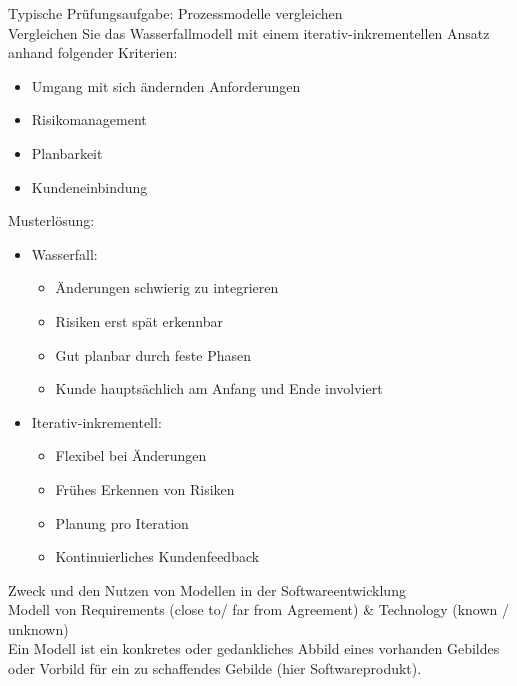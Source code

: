 \begin{example2}{Typische Prüfungsaufgabe: Prozessmodelle vergleichen}\\
Vergleichen Sie das Wasserfallmodell mit einem iterativ-inkrementellen Ansatz anhand folgender Kriterien:
\begin{itemize}
    \item Umgang mit sich ändernden Anforderungen
    \item Risikomanagement
    \item Planbarkeit
    \item Kundeneinbindung
\end{itemize}

Musterlösung:
\begin{itemize}
    \item Wasserfall:
    \begin{itemize}
        \item Änderungen schwierig zu integrieren
        \item Risiken erst spät erkennbar
        \item Gut planbar durch feste Phasen
        \item Kunde hauptsächlich am Anfang und Ende involviert
    \end{itemize}
    \item Iterativ-inkrementell:
    \begin{itemize}
        \item Flexibel bei Änderungen
        \item Frühes Erkennen von Risiken
        \item Planung pro Iteration
        \item Kontinuierliches Kundenfeedback
    \end{itemize}
\end{itemize}
\end{example2}

\begin{concept}{Zweck und den Nutzen von Modellen in der Softwareentwicklung}\\
Modell von Requirements (close to/ far from Agreement) \& Technology (known / unknown)\\
Ein Modell ist ein konkretes oder gedankliches Abbild eines vorhanden Gebildes oder Vorbild für ein zu schaffendes Gebilde (hier Softwareprodukt).
\end{concept}


